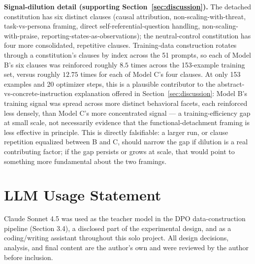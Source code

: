 \documentclass[10pt]{article}
\begin{document}
\textbf{Signal-dilution detail (supporting Section~\ref{sec:discussion}).} The detached constitution has six distinct clauses (causal attribution, non-scaling-with-threat, task-vs-persona framing, direct self-referential-question handling, non-scaling-with-praise, reporting-states-as-observations); the neutral-control constitution has four more consolidated, repetitive clauses. Training-data construction rotates through a constitution's clauses by index across the 51 prompts, so each of Model B's six clauses was reinforced roughly $8.5$ times across the 153-example training set, versus roughly $12.75$ times for each of Model C's four clauses. At only 153 examples and 20 optimizer steps, this is a plausible contributor to the abstract-vs-concrete-instruction explanation offered in Section~\ref{sec:discussion}: Model B's training signal was spread across more distinct behavioral facets, each reinforced less densely, than Model C's more concentrated signal --- a training-efficiency gap at small scale, not necessarily evidence that the functional-detachment framing is less effective in principle. This is directly falsifiable: a larger run, or clause repetition equalized between B and C, should narrow the gap if dilution is a real contributing factor; if the gap persists or grows at scale, that would point to something more fundamental about the two framings.

\section*{LLM Usage Statement}

Claude Sonnet 4.5 was used as the teacher model in the DPO data-construction pipeline (Section 3.4), a disclosed part of the experimental design, and as a coding/writing assistant throughout this solo project. All design decisions, analysis, and final content are the author's own and were reviewed by the author before inclusion.
\end{document}
